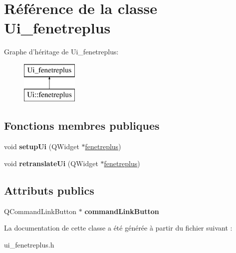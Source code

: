 \hypertarget{class_ui__fenetreplus}{\section{Référence de la classe Ui\+\_\+fenetreplus}
\label{class_ui__fenetreplus}
}
Graphe d'héritage de Ui\+\_\+fenetreplus\+:\begin{figure}[H]
\begin{center}
\leavevmode
\includegraphics[height=2.000000cm]{class_ui__fenetreplus}
\end{center}
\end{figure}
\subsection*{Fonctions membres publiques}
\begin{DoxyCompactItemize}
\item 
\hypertarget{class_ui__fenetreplus_ad9ec92335e0e91902dcd1315dea84277}{void {\bfseries setup\+Ui} (Q\+Widget $\ast$\hyperlink{classfenetreplus}{fenetreplus})}\label{class_ui__fenetreplus_ad9ec92335e0e91902dcd1315dea84277}

\item 
\hypertarget{class_ui__fenetreplus_abbb24df954d24d1b5bea37d4a643bc85}{void {\bfseries retranslate\+Ui} (Q\+Widget $\ast$\hyperlink{classfenetreplus}{fenetreplus})}\label{class_ui__fenetreplus_abbb24df954d24d1b5bea37d4a643bc85}

\end{DoxyCompactItemize}
\subsection*{Attributs publics}
\begin{DoxyCompactItemize}
\item 
\hypertarget{class_ui__fenetreplus_a2c4285d9a61770e3c2e9f757baf8b69b}{Q\+Command\+Link\+Button $\ast$ {\bfseries command\+Link\+Button}}\label{class_ui__fenetreplus_a2c4285d9a61770e3c2e9f757baf8b69b}

\end{DoxyCompactItemize}


La documentation de cette classe a été générée à partir du fichier suivant \+:\begin{DoxyCompactItemize}
\item 
ui\+\_\+fenetreplus.\+h\end{DoxyCompactItemize}
